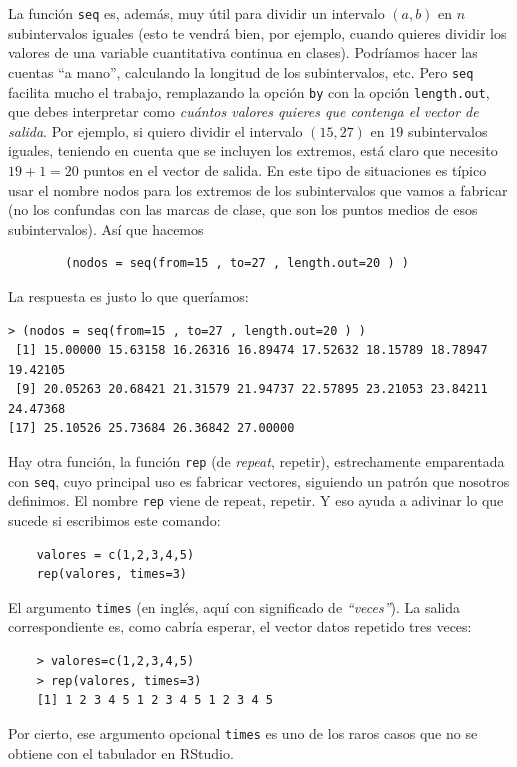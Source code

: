 \documentclass[10pt,a4paper]{article}\usepackage[]{graphicx}\usepackage[]{color}
\newcounter {cont01}
\begin{document}
La función {\tt seq} es, además, muy útil para dividir un intervalo $(a,b)$ en $n$ subintervalos iguales (esto te vendrá bien, por ejemplo, cuando quieres dividir los valores de una variable cuantitativa continua en clases). Podríamos hacer las cuentas ``a mano'', calculando la longitud de los subintervalos, etc. Pero {\tt seq} facilita mucho el trabajo, remplazando la opción {\tt by} con la opción {\tt length.out}, que debes interpretar como {\em cuántos valores quieres que contenga el vector de salida}. Por ejemplo, si quiero dividir el intervalo $(15,27)$ en $19$ subintervalos iguales, teniendo en cuenta que se incluyen los extremos, está claro que necesito $19+1=20$ puntos en el vector de salida. En este tipo de situaciones es típico usar el nombre {\sf nodos} para los extremos de los subintervalos que vamos a fabricar (no los confundas con las marcas de clase, que son los puntos medios de esos subintervalos). Así que hacemos
    \begin{verbatim}
        (nodos = seq(from=15 , to=27 , length.out=20 ) )
    \end{verbatim}
La respuesta es justo lo que queríamos:
\begin{verbatim}
> (nodos = seq(from=15 , to=27 , length.out=20 ) )
 [1] 15.00000 15.63158 16.26316 16.89474 17.52632 18.15789 18.78947 19.42105
 [9] 20.05263 20.68421 21.31579 21.94737 22.57895 23.21053 23.84211 24.47368
[17] 25.10526 25.73684 26.36842 27.00000
\end{verbatim}

Hay otra función, la función {\tt rep} (de {\em repeat}, repetir), estrechamente emparentada con {\tt seq}, cuyo principal uso es fabricar vectores, siguiendo un patrón que nosotros definimos. El nombre {\tt rep} viene de repeat, repetir. Y eso ayuda a adivinar lo que sucede si escribimos este comando:
    \begin{verbatim}
    valores = c(1,2,3,4,5)
    rep(valores, times=3)
    \end{verbatim}
El argumento {\tt times} (en inglés, aquí con significado de  {\em ``veces''}). La salida correspondiente es, como cabría esperar, el vector datos repetido tres veces:
    \begin{verbatim}
    > valores=c(1,2,3,4,5)
    > rep(valores, times=3)
    [1] 1 2 3 4 5 1 2 3 4 5 1 2 3 4 5
    \end{verbatim}
Por cierto, ese argumento opcional {\tt times} es uno de los raros casos que no se obtiene con el tabulador en RStudio.\\
\end{document}
